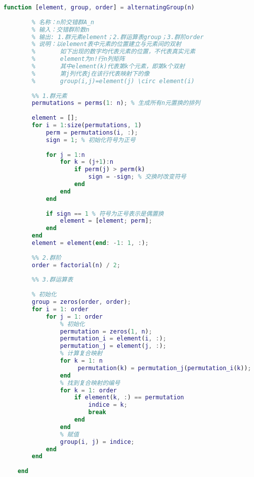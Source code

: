 \begin{lstlisting}[language=Matlab, caption={交错群}, label={alternatingGroup}]
	function [element, group, order] = alternatingGroup(n)
	
	    % 名称：n阶交错群A_n
	    % 输入：交错群阶数n
	    % 输出: 1.群元素element；2.群运算表group；3.群阶order
	    % 说明：以element表中元素的位置建立与元素间的双射
	    %       如下出现的数字均代表元素的位置，不代表真实元素
	    %       element为n!行n列矩阵
	    %       其中element(k)代表第k个元素，即第k个双射
	    %       第j列代表j在该行代表映射下的像
	    %       group(i,j)=element(j) \circ element(i)
	
	    %% 1.群元素
	    permutations = perms(1: n); % 生成所有n元置换的排列
	
	    element = [];
	    for i = 1:size(permutations, 1)
	        perm = permutations(i, :);
	        sign = 1; % 初始化符号为正号
	        
	        for j = 1:n
	            for k = (j+1):n
	                if perm(j) > perm(k)
	                    sign = -sign; % 交换时改变符号
	                end
	            end
	        end
	        
	        if sign == 1 % 符号为正号表示是偶置换
	            element = [element; perm];
	        end
	    end
	    element = element(end: -1: 1, :);
	
	    %% 2.群阶
	    order = factorial(n) / 2;
	
	    %% 3.群运算表
	    
	    % 初始化
	    group = zeros(order, order);
	    for i = 1: order
	        for j = 1: order
	            % 初始化
	            permutation = zeros(1, n);
	            permutation_i = element(i, :);
	            permutation_j = element(j, :);
	            % 计算复合映射
	            for k = 1: n
	                 permutation(k) = permutation_j(permutation_i(k));
	            end
	            % 找到复合映射的编号
	            for k = 1: order
	                if element(k, :) == permutation
	                    indice = k;
	                    break
	                end
	            end
	            % 赋值
	            group(i, j) = indice;
	        end
	    end
	
	end
	
\end{lstlisting}

